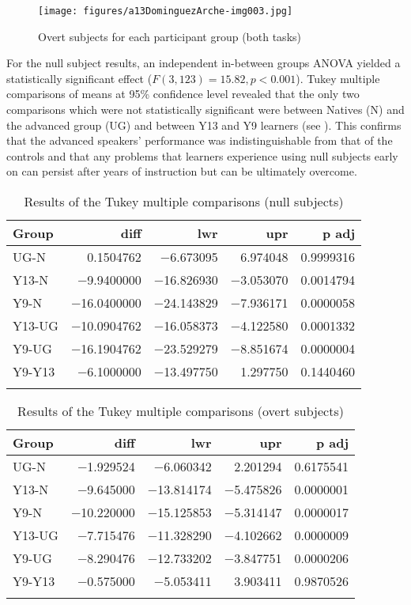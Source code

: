 \documentclass[output=paper]{langscibook}
\begin{document}
\begin{figure}[p]
\caption{Overt subjects for each participant group (both tasks)}
\texttt{[image: figures/a13DominguezArche-img003.jpg]}
\label{fig:dominguez:3}
\end{figure}

\begin{sloppypar}
For the null subject results, an independent in-between groups ANOVA yielded a statistically significant effect ($F(3,123) = 15.82,\allowbreak p <0.001$). Tukey multiple comparisons of means at 95\% confidence level revealed that the only two comparisons which were not statistically significant were between Natives (N) and the advanced group (UG) and between Y13 and Y9 learners (see ). This confirms that the advanced speakers' performance was indistinguishable from that of the controls and that any problems that learners experience using null subjects early on can persist after years of instruction but can be ultimately overcome.
\end{sloppypar}

\begin{table}
\caption{Results of the Tukey multiple comparisons (null subjects)\label{tab:dominguez:4}}
\begin{tabular}{lrrrr}
\lsptoprule
Group & diff & lwr & upr & p adj\\\midrule
UG-N & 0.1504762 & −6.673095 & 6.974048 & 0.9999316\\
Y13-N & −9.9400000 & −16.826930 & −3.053070 & 0.0014794\\
Y9-N & −16.0400000 & −24.143829 & −7.936171 & 0.0000058\\
Y13-UG & −10.0904762 & −16.058373 & −4.122580 & 0.0001332\\
Y9-UG & −16.1904762 & −23.529279 & −8.851674 & 0.0000004\\
Y9-Y13 & −6.1000000 & −13.497750 & 1.297750 & 0.1440460\\
\lspbottomrule
\end{tabular}
\end{table}

\begin{table}
\caption{Results of the Tukey multiple comparisons (overt subjects)}
\label{tab:dominguez:5}
\begin{tabular}{lrrrr}
\lsptoprule
Group & diff & lwr & upr & p adj\\\midrule
UG-N & −1.929524 & −6.060342 & 2.201294 & 0.6175541\\
Y13-N & −9.645000 & −13.814174 & −5.475826 & 0.0000001\\
Y9-N & −10.220000 & −15.125853 & −5.314147 & 0.0000017\\
Y13-UG & −7.715476 & −11.328290 & −4.102662 & 0.0000009\\
Y9-UG & −8.290476 & −12.733202 & −3.847751 & 0.0000206\\
Y9-Y13 & −0.575000 & −5.053411 & 3.903411 & 0.9870526\\
\lspbottomrule
\end{tabular}
\end{table}
\end{document}
